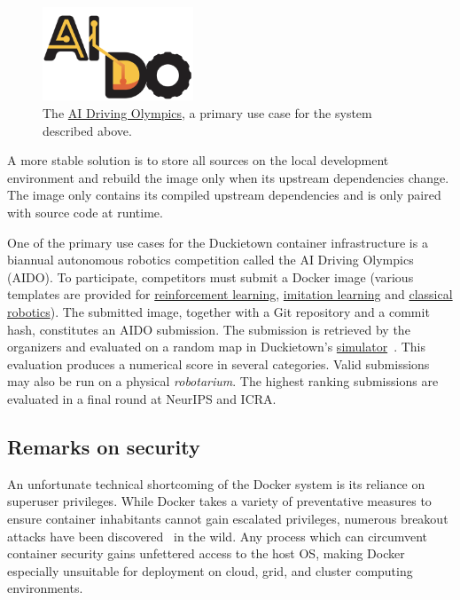 \begin{figure}
\includegraphics[width=0.40\textwidth]{../figures/aido_logo.png}
\caption{The \href{https://www.duckietown.org/research/ai-driving-olympics}{AI Driving Olympics}, a primary use case for the system described above.}
\label{fig:aido_logo}
\end{figure}

A more stable solution is to store all sources on the local development environment and rebuild the image only when its upstream dependencies change. The image only contains its compiled upstream dependencies and is only paired with source code at runtime.

One of the primary use cases for the Duckietown container infrastructure is a biannual autonomous robotics competition called the AI Driving Olympics~\citep{aido2018} (AIDO). To participate, competitors must submit a Docker image (various templates are provided for \href{https://github.com/duckietown/challenge-aido_LF-baseline-RL-sim-pytorch}{reinforcement learning}, \href{https://github.com/duckietown/challenge-aido_LF-baseline-IL-logs-tensorflow}{imitation learning} and \href{https://github.com/duckietown/challenge-aido_LF-template-ros}{classical robotics}). The submitted image, together with a Git repository and a commit hash, constitutes an AIDO submission. The submission is retrieved by the organizers and evaluated on a random map in Duckietown's \href{https://github.com/duckietown/gym-duckietown}{simulator}~\citep{gym_duckietown}. This evaluation produces a numerical score in several categories. Valid submissions may also be run on a physical \textit{robotarium}. The highest ranking submissions are evaluated in a final round at NeurIPS and ICRA.

\subsection{Remarks on security}

An unfortunate technical shortcoming of the Docker system is its reliance on superuser privileges. While Docker takes a variety of preventative measures to ensure container inhabitants cannot gain escalated privileges, numerous breakout attacks have been discovered~\citep{martin2018docker} in the wild. Any process which can circumvent container security gains unfettered access to the host OS, making Docker especially unsuitable for deployment on cloud, grid, and cluster computing environments.

